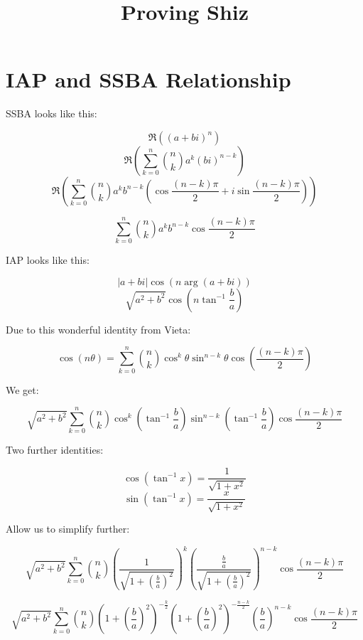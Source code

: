\documentclass[a4paper]{article}
\title{Proving Shiz}
\author{}
\date{}
\begin{document}
\maketitle

\section{IAP and SSBA Relationship}
	SSBA looks like this:

	\[ \Re \left( (a + bi)^{n} \right) \]
	\[ \Re \left( \sum_{k=0}^{n} \binom{n}{k} a^{k} (bi)^{n-k} \right) \]
	\[ \Re \left( \sum_{k=0}^{n} \binom{n}{k} a^{k} b^{n-k} \left( \cos\frac{(n-k)\pi}{2}
								       + i\sin\frac{(n-k)\pi}{2}
							               \right) \right) \]

	\[ \sum_{k=0}^{n} \binom{n}{k} a^{k} b^{n-k} \cos\frac{(n-k)\pi}{2} \]

	IAP looks like this:

	\[ |a + bi|\cos(n\arg(a + bi)) \]
	\[ \sqrt{a^{2} + b^{2}} \cos \left( n\tan^{-1}\frac{b}{a} \right) \]

	Due to this wonderful identity from Vieta:

	\[ \cos(n\theta) = \sum_{k=0}^{n} \binom{n}{k} 
		                          \cos^{k}\theta 
					  \sin^{n-k}\theta 
					  \cos \left( \frac{(n-k)\pi}{2} \right) \]

	We get:

	\[ \sqrt{a^{2} + b^{2}} \sum_{k=0}^{n} \binom{n}{k}
		                               \cos^{k} \left( \tan^{-1}\frac{b}{a} \right)
	                                       \sin^{n-k} \left( \tan^{-1}\frac{b}{a} \right) 
					       \cos \frac{(n-k)\pi}{2} \]

	Two further identities:

	\[ \cos(\tan^{-1}x) = \frac{1}{\sqrt{1 + x^2}} \]
	\[ \sin(\tan^{-1}x) = \frac{x}{\sqrt{1 + x^2}} \]

	Allow us to simplify further:

	\[ \sqrt{a^{2} + b^{2}} \sum_{k=0}^{n} \binom{n}{k}
				   	       \left( \frac{1}{\sqrt{1 + \left( \frac{b}{a} \right)^{2}}} \right)^{k}
					       \left( \frac{\frac{b}{a}}{\sqrt{1 + \left( \frac{b}{a} \right)^{2}}}
					       		\right)^{n-k}
					       \cos \frac{(n-k)\pi}{2} \]

	\[ \sqrt{a^{2} + b^{2}} \sum_{k=0}^{n} \binom{n}{k}
					       \left( 1 + \left( \frac{b}{a} \right) ^{2} \right)^{-\frac{k}{2}}
					       \left( 1 + \left( \frac{b}{a} \right) ^{2} \right)^{-\frac{n-k}{2}}
					       \left( \frac{b}{a} \right)^{n-k}
					       \cos \frac{(n-k)\pi}{2} \]
	
\end{document}
